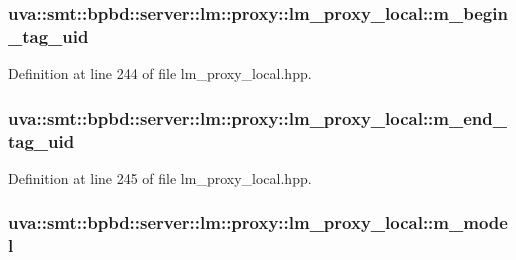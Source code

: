 \subsubsection[{m\+\_\+begin\+\_\+tag\+\_\+uid}]{ uva\+::smt\+::bpbd\+::server\+::lm\+::proxy\+::lm\+\_\+proxy\+\_\+local\+::m\+\_\+begin\+\_\+tag\+\_\+uid\hspace{0.3cm}{\ttfamily [protected]}}\label{classuva_1_1smt_1_1bpbd_1_1server_1_1lm_1_1proxy_1_1lm__proxy__local_adf9f94e10e1d210e35c7716b08b89977}


Definition at line 244 of file lm\+\_\+proxy\+\_\+local.\+hpp.

\hypertarget{classuva_1_1smt_1_1bpbd_1_1server_1_1lm_1_1proxy_1_1lm__proxy__local_a656493c20699367286febb880cbf1ca1}{}
\subsubsection[{m\+\_\+end\+\_\+tag\+\_\+uid}]{ uva\+::smt\+::bpbd\+::server\+::lm\+::proxy\+::lm\+\_\+proxy\+\_\+local\+::m\+\_\+end\+\_\+tag\+\_\+uid\hspace{0.3cm}{\ttfamily [protected]}}\label{classuva_1_1smt_1_1bpbd_1_1server_1_1lm_1_1proxy_1_1lm__proxy__local_a656493c20699367286febb880cbf1ca1}


Definition at line 245 of file lm\+\_\+proxy\+\_\+local.\+hpp.

\hypertarget{classuva_1_1smt_1_1bpbd_1_1server_1_1lm_1_1proxy_1_1lm__proxy__local_ac9984821921672cd3ee113005d5412dd}{}
\subsubsection[{m\+\_\+model}]{ uva\+::smt\+::bpbd\+::server\+::lm\+::proxy\+::lm\+\_\+proxy\+\_\+local\+::m\+\_\+model\hspace{0.3cm}{\ttfamily [protected]}}\label{classuva_1_1smt_1_1bpbd_1_1server_1_1lm_1_1proxy_1_1lm__proxy__local_ac9984821921672cd3ee113005d5412dd}


